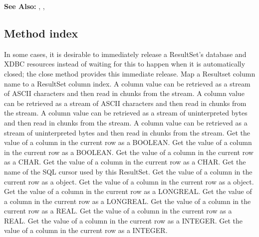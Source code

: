 {\bf See Also:} 
     , , 

\subsection{Method index}

\begin{description}
     In some cases, it is desirable to immediately release a ResultSet's database and XDBC resources instead of waiting for this to
     happen when it is automatically closed; the close method provides this immediate release. 
     Map a Resultset column name to a ResultSet column index. 
     A column value can be retrieved as a stream of ASCII characters and then read in chunks from the stream. 
     A column value can be retrieved as a stream of ASCII characters and then read in chunks from the stream. 
     A column value can be retrieved as a stream of uninterpreted bytes and then read in chunks from the stream. 
     A column value can be retrieved as a stream of uninterpreted bytes and then read in chunks from the stream. 
     Get the value of a column in the current row as a BOOLEAN. 
     Get the value of a column in the current row as a BOOLEAN. 
     Get the value of a column in the current row as a CHAR. 
     Get the value of a column in the current row as a CHAR. 
     Get the name of the SQL cursor used by this ResultSet. 
     Get the value of a column in the current row as a  object. 
     Get the value of a column in the current row as a  object. 
     Get the value of a column in the current row as a LONGREAL. 
     Get the value of a column in the current row as a LONGREAL. 
     Get the value of a column in the current row as a REAL. 
     Get the value of a column in the current row as a REAL. 
     Get the value of a column in the current row as a INTEGER. 
     Get the value of a column in the current row as a INTEGER. 

\end{description}
